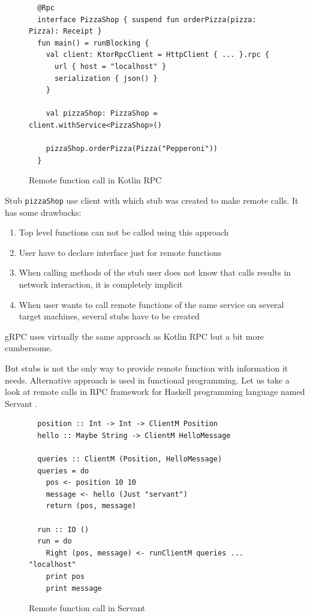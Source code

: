 \documentclass[a4paper,11pt,oneside]{article}
\newcommand{\kotlini}[1]{\texttt{#1}}
\begin{document}
\begin{figure}[!h]
  \begin{verbatim}
  @Rpc
  interface PizzaShop { suspend fun orderPizza(pizza: Pizza): Receipt }
  fun main() = runBlocking {
    val client: KtorRpcClient = HttpClient { ... }.rpc {
      url { host = "localhost" }
      serialization { json() }
    }

    val pizzaShop: PizzaShop = client.withService<PizzaShop>()

    pizzaShop.orderPizza(Pizza("Pepperoni"))
  }
  \end{verbatim}
  \caption{Remote function call in Kotlin RPC}\label{krpc_remote_call}
\end{figure}

Stub \kotlini{pizzaShop} use client with which stub was created to make remote calls.
It has some drawbacks:
\begin{enumerate}
  \item Top level functions can not be called using this approach
  \item User have to declare interface just for remote functions
  \item When calling methods of the stub user does not know that calls results in network 
  interaction, it is completely implicit
  \item When user wants to call remote functions of the same service on several target machines, several
  stubs have to be created 
\end{enumerate}

gRPC uses virtually the same approach as Kotlin RPC but a bit more cumbersome.

But stubs is not the only way to provide remote function with information it needs. Alternative
approach is used in functional programming. Let us take a look at remote calls in RPC framework for
Haskell programming language named Servant \cite{noauthor_servant_nodate}.

\begin{figure}[!h]
  \begin{verbatim}
  position :: Int -> Int -> ClientM Position
  hello :: Maybe String -> ClientM HelloMessage

  queries :: ClientM (Position, HelloMessage)
  queries = do
    pos <- position 10 10
    message <- hello (Just "servant")
    return (pos, message)

  run :: IO ()
  run = do
    Right (pos, message) <- runClientM queries ... "localhost"
    print pos
    print message
  \end{verbatim}
  \caption{Remote function call in Servant}\label{servant_remote_call}
\end{figure}
\end{document}
